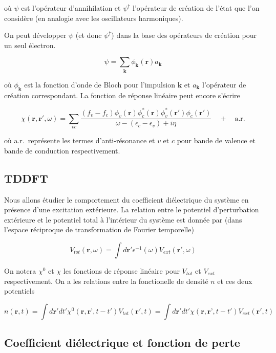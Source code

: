 \documentclass[12pt, french]{report}
\theoremstyle{theoreme}
\begin{document}
où $\psi$ est l'opérateur d'annihilation et $\psi^\dagger$ l'opérateur de création de l'état que l'on considère (en analogie avec les oscillateurs harmoniques).

On peut développer $\psi$ (et donc $\psi^\dagger$) dans la base des opérateurs de création
pour un seul électron.

$$
\psi = \sum_\textbf{k} \phi_\textbf{k}(\textbf{r}) a_\textbf{k}
$$

où $\phi_\textbf{k}$ est la fonction d'onde de Bloch pour l'impulsion $\textbf{k}$ et $a_\textbf{k}$ l'opérateur de création correspondant. La fonction de réponse linéaire peut encore s'écrire

\begin{equation}\label{chi}
  \chi(\textbf{r}, \textbf{r}', \omega) = \sum_{vc} \frac{(f_v - f_c)\phi_v(\textbf{r}) \phi_c^*(\textbf{r}) \phi_v^*(\textbf{r}') \phi_c(\textbf{r}')}{\omega - (\epsilon_c - \epsilon_v) + i\eta} \quad + \quad \text{a.r.}
\end{equation}

où a.r.\ représente les termes d'anti-résonance et $v$ et $c$ pour bande de valence et bande de conduction respectivement.

\subsection{TDDFT}
Nous allons étudier le comportement du coefficient diélectrique du système en présence d'une excitation extérieure. La relation entre le potentiel d'perturbation extérieure et le potentiel total à l'intérieur du système est donnée par (dans l'espace réciproque de transformation de Fourier temporelle)

$$
V_{tot}(\textbf{r}, \omega) = \int d\textbf{r}' \epsilon^{-1}(\omega) V_{ext}(\textbf{r}', \omega)
$$

On notera $\chi^0$ et $\chi$ les fonctions de réponse linéaire pour $V_{tot}$ et $V_{ext}$ respectivement. On a les relations entre la fonctionelle de densité $n$ et ces deux potentiels

$$
n(\textbf{r}, t) = \int d\textbf{r}' dt' \chi^0(\textbf{r}, \textbf{r'}, t-t') V_{tot}(\textbf{r}', t) = \int d\textbf{r}' dt' \chi(\textbf{r}, \textbf{r'}, t-t') V_{ext}(\textbf{r}', t)
$$

\subsection{Coefficient diélectrique et fonction de perte}
\end{document}
